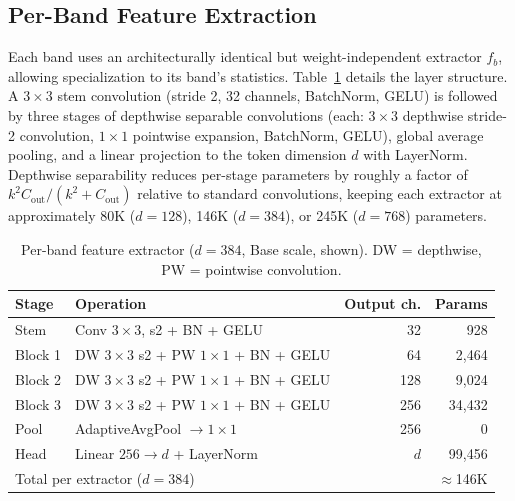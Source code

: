 \documentclass[journal]{IEEEtran}
\begin{document}
\subsection{Per-Band Feature Extraction}
\label{sec:extractor}
Each band uses an architecturally identical but weight-independent extractor $f_b$, allowing specialization to its band's statistics. Table~\ref{tab:extractor} details the layer structure. A $3\times3$ stem convolution (stride 2, 32 channels, BatchNorm, GELU) is followed by three stages of depthwise separable convolutions (each: $3\times3$ depthwise stride-2 convolution, $1\times1$ pointwise expansion, BatchNorm, GELU), global average pooling, and a linear projection to the token dimension $d$ with LayerNorm. Depthwise separability reduces per-stage parameters by roughly a factor of $k^2 C_{\mathrm{out}} / (k^2 + C_{\mathrm{out}})$ relative to standard convolutions, keeping each extractor at approximately 80K ($d{=}128$), 146K ($d{=}384$), or 245K ($d{=}768$) parameters.

\begin{table}[!t]
\renewcommand{\arraystretch}{1.2}
\caption{Per-band feature extractor ($d = 384$, Base scale, shown). DW = depthwise, PW = pointwise convolution.}
\label{tab:extractor}
\centering
\setlength{\tabcolsep}{4pt}
\begin{tabular}{llrr}
\toprule
Stage & Operation & Output ch. & Params \\
\midrule
Stem    & Conv $3{\times}3$, s2 + BN + GELU        & 32  & 928 \\
Block 1 & DW $3{\times}3$ s2 + PW $1{\times}1$ + BN + GELU & 64  & 2{,}464 \\
Block 2 & DW $3{\times}3$ s2 + PW $1{\times}1$ + BN + GELU & 128 & 9{,}024 \\
Block 3 & DW $3{\times}3$ s2 + PW $1{\times}1$ + BN + GELU & 256 & 34{,}432 \\
Pool    & AdaptiveAvgPool $\rightarrow 1{\times}1$  & 256 & 0 \\
Head    & Linear $256 \rightarrow d$ + LayerNorm    & $d$ & 99{,}456 \\
\midrule
\multicolumn{3}{l}{Total per extractor ($d=384$)} & $\approx$146K \\
\bottomrule
\end{tabular}
\end{table}
\end{document}
